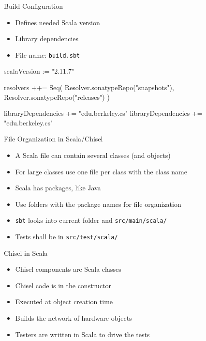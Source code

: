 \documentclass[xcolor=pdflatex,dvipsnames,table]{beamer}
\newcommand{\code}[1]{{\texttt{#1}}}
\begin{document}
\begin{frame}[fragile]{Build Configuration}
\begin{itemize}
\item Defines needed Scala version
\item Library dependencies
\item File name: \code{build.sbt}
\end{itemize}
\begin{chisel}
scalaVersion := "2.11.7"

resolvers ++= Seq(
  Resolver.sonatypeRepo("snapshots"),
  Resolver.sonatypeRepo("releases")
)

libraryDependencies += "edu.berkeley.cs" %
libraryDependencies += "edu.berkeley.cs" %
\end{chisel}
\end{frame}

\begin{frame}[fragile]{File Organization in Scala/Chisel}
\begin{itemize}
\item A Scala file can contain several classes (and objects)
\item For large classes use one file per class with the class name
\item Scala has packages, like Java
\item Use folders with the package names for file organization
\item \code{sbt} looks into current folder and \code{src/main/scala/}
\item Tests shall be in \code{src/test/scala/}
\end{itemize}
\end{frame}

\begin{frame}[fragile]{Chisel in Scala}
\begin{itemize}
\item Chisel components are Scala classes
\item Chisel code is in the constructor
\item Executed at object creation time
\item Builds the network of hardware objects
\item Testers are written in Scala to drive the tests
\end{itemize}
\end{frame}
\end{document}
